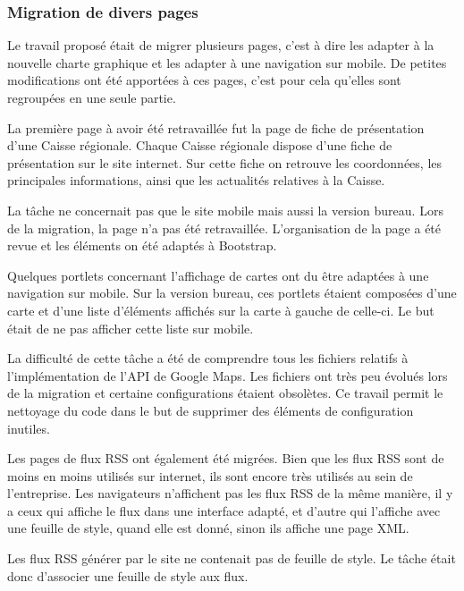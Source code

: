 \documentclass[12pt,a4paper]{article}
\begin{document}
\subsubsection{Migration de divers pages}
Le travail proposé était de migrer plusieurs pages, c'est à dire les adapter à la nouvelle charte graphique et les adapter à une navigation sur mobile. De petites modifications ont été apportées à ces pages, c'est pour cela qu'elles sont regroupées en une seule partie.\par 
\bigskip
La première page à avoir été retravaillée fut la page de fiche de présentation d'une Caisse régionale. Chaque Caisse régionale dispose d'une fiche de présentation sur le site internet. Sur cette fiche on retrouve les coordonnées, les principales informations, ainsi que les actualités relatives à la Caisse.\par 
La tâche ne concernait pas que le site mobile mais aussi la version bureau. Lors de la migration, la page n'a pas été retravaillée. L'organisation de la page a été revue et les éléments on été adaptés à Bootstrap.\par 
\bigskip
Quelques portlets concernant l'affichage de cartes ont du être adaptées à une navigation sur mobile. Sur la version bureau, ces portlets étaient composées d'une carte et d'une liste d'éléments affichés sur la carte à gauche de celle-ci. Le but était de ne pas afficher cette liste sur mobile.\par 
La difficulté de cette tâche a été de comprendre tous les fichiers relatifs à l'implémentation de l'API de Google Maps. Les fichiers ont très peu évolués lors de la migration et certaine configurations étaient obsolètes. Ce travail permit le nettoyage du code dans le but de supprimer des éléments de configuration inutiles.\par
\bigskip
Les pages de flux RSS ont également été migrées. Bien que les flux RSS sont de moins en moins utilisés sur internet, ils sont encore très utilisés au sein de l'entreprise. Les navigateurs n'affichent pas les flux RSS de la même manière, il y a ceux qui affiche le flux dans une interface adapté, et d'autre qui l'affiche avec une feuille de style, quand elle est donné, sinon ils affiche une page XML.\par 
Les flux RSS générer par le site ne contenait pas de feuille de style. Le tâche était donc d'associer une feuille de style aux flux.\par
\end{document}
